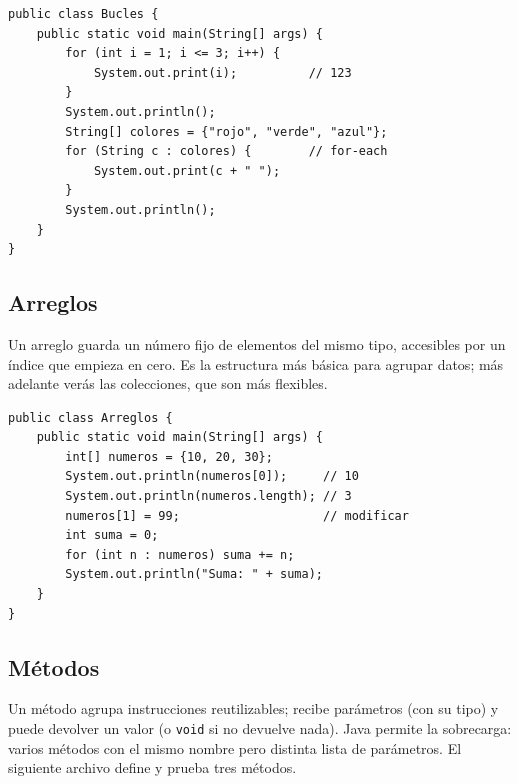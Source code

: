 \documentclass[11pt]{article}
\begin{document}
\begin{cajacodigo}
\begin{lstlisting}[style=java]
public class Bucles {
    public static void main(String[] args) {
        for (int i = 1; i <= 3; i++) {
            System.out.print(i);          // 123
        }
        System.out.println();
        String[] colores = {"rojo", "verde", "azul"};
        for (String c : colores) {        // for-each
            System.out.print(c + " ");
        }
        System.out.println();
    }
}
\end{lstlisting}
\end{cajacodigo}
\vspace{2pt}
\subsection{Arreglos}
Un arreglo guarda un número fijo de elementos del mismo tipo, accesibles por un índice que empieza en cero. Es la estructura más básica para agrupar datos; más adelante verás las colecciones, que son más flexibles.

\begin{cajacodigo}
\begin{lstlisting}[style=java]
public class Arreglos {
    public static void main(String[] args) {
        int[] numeros = {10, 20, 30};
        System.out.println(numeros[0]);     // 10
        System.out.println(numeros.length); // 3
        numeros[1] = 99;                    // modificar
        int suma = 0;
        for (int n : numeros) suma += n;
        System.out.println("Suma: " + suma);
    }
}
\end{lstlisting}
\end{cajacodigo}
\vspace{2pt}
\subsection{Métodos}
Un método agrupa instrucciones reutilizables; recibe parámetros (con su tipo) y puede devolver un valor (o \texttt{void} si no devuelve nada). Java permite la sobrecarga: varios métodos con el mismo nombre pero distinta lista de parámetros. El siguiente archivo define y prueba tres métodos.
\end{document}

